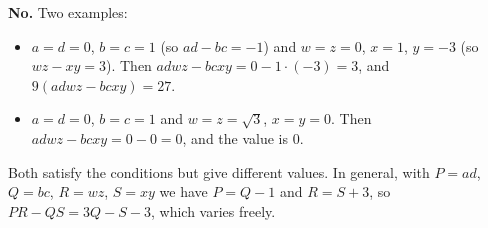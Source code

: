 \textbf{No.} Two examples:
\begin{itemize}
\item $a=d=0$, $b=c=1$ (so $ad-bc=-1$) and $w=z=0$, $x=1$, $y=-3$ (so $wz-xy=3$). Then $adwz-bcxy=0-1\cdot(-3)=3$, and $9(adwz-bcxy)=27$.
\item $a=d=0$, $b=c=1$ and $w=z=\sqrt3$, $x=y=0$. Then $adwz-bcxy=0-0=0$, and the value is $0$.
\end{itemize}
Both satisfy the conditions but give different values. In general, with $P=ad$, $Q=bc$, $R=wz$, $S=xy$ we have $P=Q-1$ and $R=S+3$, so $PR-QS=3Q-S-3$, which varies freely.
